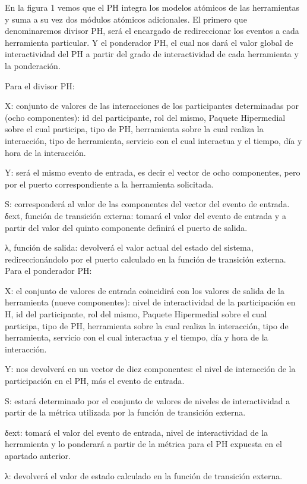 En la figura 1 vemos que el PH integra los modelos atómicos de las herramientas y suma a su vez dos módulos atómicos adicionales. El primero que denominaremos divisor PH, será el encargado de redireccionar los eventos a cada herramienta particular. Y el ponderador PH, el cual nos dará el valor global de interactividad del PH a partir del grado de interactividad de cada herramienta y la ponderación.

Para el divisor PH:

X: conjunto de valores de las interacciones de los participantes determinadas por (ocho componentes):  id del participante, rol del mismo, Paquete Hipermedial sobre el cual participa, tipo de PH, herramienta sobre la cual realiza la interacción, tipo de herramienta, servicio con el cual interactua y el tiempo, día y hora de la interacción.

Y: será el mismo evento de entrada, es decir el vector de ocho componentes, pero por el puerto correspondiente a la herramienta solicitada.

S: corresponderá al valor de las componentes del vector del evento de entrada.
δext, función de transición externa: tomará el valor del evento de entrada y a partir del valor del quinto componente definirá el puerto de salida.

λ, función de salida: devolverá el valor actual del estado del sistema, redireccionándolo por el puerto calculado en la función de transición externa.
Para el ponderador PH:

X: el conjunto de valores de entrada coincidirá con los valores de salida de la herramienta (nueve componentes): nivel de interactividad de la participación en H, id del participante, rol del mismo, Paquete Hipermedial sobre el cual participa, tipo de PH, herramienta sobre la cual realiza la interacción, tipo de herramienta, servicio con el cual interactua y el tiempo, día y hora de la interacción.

Y: nos devolverá en un vector de diez componentes: el nivel de interacción de la participación en el PH, más el evento de entrada.

S: estará determinado por el conjunto de valores de niveles de interactividad a partir de la métrica utilizada por la función de transición externa. 

δext: tomará el valor del evento de entrada, nivel de interactividad de la herramienta y lo ponderará a partir de la métrica para el PH expuesta en el apartado anterior.

λ: devolverá el valor de estado calculado en la función de transición externa.

